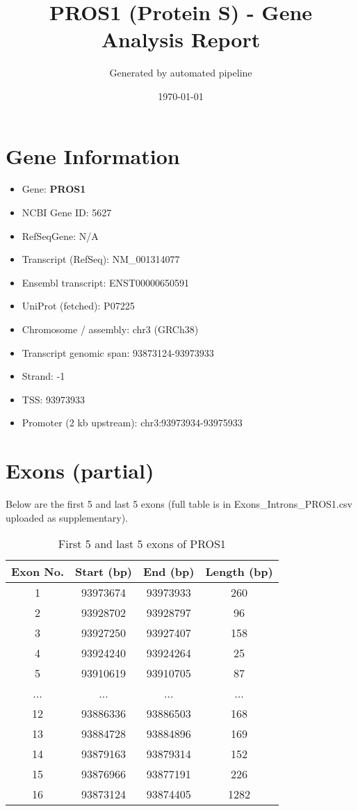 \documentclass[12pt,a4paper]{article}
\title{PROS1 (Protein S) - Gene Analysis Report}
\author{Generated by automated pipeline}
\date{\today}
\begin{document}
\maketitle

\section*{Gene Information}
\begin{itemize}
  \item Gene: \textbf{PROS1}
  \item NCBI Gene ID: 5627
  \item RefSeqGene: N/A
  \item Transcript (RefSeq): NM_001314077
  \item Ensembl transcript: ENST00000650591
  \item UniProt (fetched): P07225
  \item Chromosome / assembly: chr3 (GRCh38)
  \item Transcript genomic span: 93873124-93973933
  \item Strand: -1
  \item TSS: 93973933
  \item Promoter (2 kb upstream): chr3:93973934-93975933
\end{itemize}

\section*{Exons (partial)}
Below are the first 5 and last 5 exons (full table is in Exons_Introns_PROS1.csv uploaded as supplementary).

\begin{table}[H]
\centering
\begin{tabular}{|c|c|c|c|}
\hline
Exon No. & Start (bp) & End (bp) & Length (bp) \\ \hline
1 & 93973674 & 93973933 & 260 \\ \hline
2 & 93928702 & 93928797 & 96 \\ \hline
3 & 93927250 & 93927407 & 158 \\ \hline
4 & 93924240 & 93924264 & 25 \\ \hline
5 & 93910619 & 93910705 & 87 \\ \hline
\hline
... & ... & ... & ... \\ \hline
12 & 93886336 & 93886503 & 168 \\ \hline
13 & 93884728 & 93884896 & 169 \\ \hline
14 & 93879163 & 93879314 & 152 \\ \hline
15 & 93876966 & 93877191 & 226 \\ \hline
16 & 93873124 & 93874405 & 1282 \\ \hline
\end{tabular}
\caption{First 5 and last 5 exons of PROS1}
\end{table}
\end{document}
